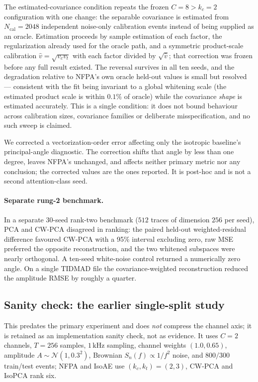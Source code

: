 

The estimated-covariance condition repeats the frozen $C=8>k_c=2$ configuration with one change: the separable covariance is estimated from $N_{\mathrm{cal}}=2048$ independent noise-only calibration events instead of being supplied as an oracle. Estimation proceeds by sample estimation of each factor, the regularization already used for the oracle path, and a symmetric product-scale calibration $\hat v=\sqrt{v_cv_t}$ with each factor divided by $\sqrt{\hat v}$; that correction was frozen before any full result existed. The reversal survives in all ten seeds, and the degradation relative to NFPA's own oracle held-out values is small but resolved --- consistent with the fit being invariant to a global whitening scale (the estimated product scale is within $0.1\%$ of oracle) while the covariance \emph{shape} is estimated accurately. This is a single condition: it does not bound behaviour across calibration sizes, covariance families or deliberate misspecification, and no such sweep is claimed.

We corrected a vectorization-order error affecting only the isotropic baseline's principal-angle diagnostic. The correction shifts that angle by less than one degree, leaves NFPA's unchanged, and affects neither primary metric nor any conclusion; the corrected values are the ones reported. It is post-hoc and is not a second attention-class seed.

\paragraph{Separate rung-2 benchmark.}
In a separate 30-seed rank-two benchmark ($512$ traces of dimension $256$ per seed), PCA and CW-PCA
disagreed in ranking: the paired held-out weighted-residual difference favoured CW-PCA with a 95\%
interval excluding zero, raw MSE preferred the opposite reconstruction, and the two whitened subspaces
were nearly orthogonal. A ten-seed white-noise control returned a numerically zero angle. On a single
TIDMAD file the covariance-weighted reconstruction reduced the amplitude RMSE by roughly a quarter.

\subsection{Sanity check: the earlier single-split study}
\label{app:single-split}

This predates the primary experiment and does \emph{not} compress the channel axis; it is retained
as an implementation sanity check, not as evidence. It uses $C=2$ channels, $T=256$ samples,
$1\,\mathrm{kHz}$ sampling, channel weights $(1.0,0.65)$, amplitude $A\sim\mathcal{N}(1,0.3^2)$,
Brownian $S_n(f)\propto1/f^2$ noise, and $800/300$ train/test events; NFPA and IsoAE use
$(k_c,k_t)=(2,3)$, CW-PCA and IsoPCA rank six.

